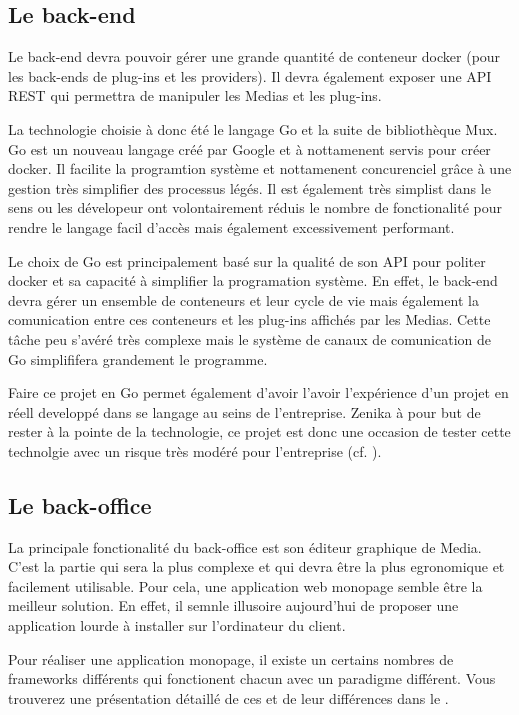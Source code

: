 \subsection{Le back-end}

  Le back-end devra pouvoir gérer une grande quantité de conteneur docker (pour les back-ends de plug-ins et les providers). Il devra également exposer une \gls{API} \gls{REST} qui permettra de manipuler les Medias et les plug-ins.

  La technologie choisie à donc été le langage \gls{Go} et la suite de bibliothèque \gls{Mux}. Go est un nouveau langage créé par Google et à nottamenent servis pour créer \gls{docker}. Il facilite la programtion système et nottamenent concurenciel grâce à une gestion très simplifier des processus légés. Il est également très simplist dans le sens ou les dévelopeur ont volontairement réduis le nombre de fonctionalité pour rendre le langage facil d'accès mais également excessivement performant.

  Le choix de Go est principalement basé sur la qualité de son \gls{API} pour politer \gls{docker} et sa capacité à simplifier la programation système. En effet, le back-end devra gérer un ensemble de conteneurs et leur cycle de vie mais également la comunication entre ces conteneurs et les plug-ins affichés par les Medias. Cette tâche peu s'avéré très complexe mais le système de canaux de comunication de Go simplififera grandement le programme.

  Faire ce projet en Go permet également d'avoir l'avoir l'expérience d'un projet en réell developpé dans se langage au seins de l'entreprise. Zenika à pour but de rester à la pointe de la technologie, ce projet est donc une occasion de tester cette technolgie avec un risque très modéré pour l'entreprise (cf. ).

\subsection{Le back-office}

  La principale fonctionalité du back-office est son éditeur graphique de Media. C'est la partie qui sera la plus complexe et qui devra être la plus egronomique et facilement utilisable. Pour cela, une application web monopage semble être la meilleur solution. En effet, il semnle illusoire aujourd'hui de proposer une application lourde à installer sur l'ordinateur du client.

  Pour réaliser une application monopage, il existe un certains nombres de \glspl{framework} différents qui fonctionent chacun avec un paradigme différent. Vous trouverez une présentation détaillé de ces \glsplframework et de leur différences dans le .

